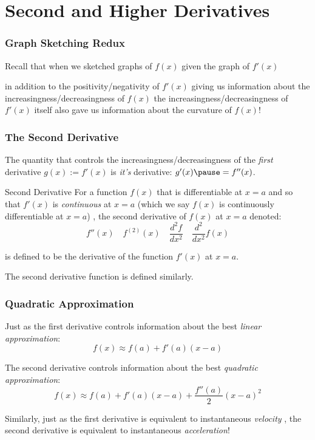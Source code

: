 \documentclass{ltx-talk}
\begin{document}
\section{Second and Higher Derivatives}

\begin{frame}
  \frametitle{Graph Sketching Redux}

  Recall that when we sketched graphs of $f(x)$ given the graph of $f'(x)$ \vfill \pause

  in addition to the positivity/negativity of $f'(x)$ giving us information about the increasingness/decreasingness of $f(x)$ \pause
  the increasingness/decreasingness of $f'(x)$ itself also gave us information \pause about the curvature of $f(x)$! \pause
\end{frame}

\begin{frame}
  \frametitle{The Second Derivative}
  The quantity that controls the increasingness/decreasingness of the \textit{first} derivative $g(x) := f'(x)$ \pause is \textit{it's} derivative: $g'(x) \pause = f''(x)$. \pause

  \begin{block}{Second Derivative}
    For a function $f(x)$ that is differentiable at $x = a$ \pause
    and so that $f'(x)$ is \textit{continuous} at $x = a$ \pause (which we say $f(x)$ is continuously differentiable at $x = a$) \pause,
    the second derivative of $f(x)$ at $x = a$ denoted: \pause
    \begin{equation}
      f''(x) \quad f^{(2)}(x) \quad \dfrac{d^2 f}{dx^2} \quad \dfrac{d^2}{dx^2} f(x)
    \end{equation} \pause

    is defined to be the derivative of the function $f'(x)$ at $x = a$. \pause

    The second derivative function is defined similarly.
  \end{block}
\end{frame}

\begin{frame}
  \frametitle{Quadratic Approximation}
  Just as the first derivative controls information about the best \textit{linear approximation}: \pause
  \begin{equation}
    f(x) \approx f(a) + f'(a)(x - a)
  \end{equation}\pause

  The second derivative controls information about the best \textit{quadratic approximation}: \pause
  \begin{equation}
    f(x) \approx f(a) + f'(a)(x - a) + \dfrac{f''(a)}{2} (x-a)^2
  \end{equation} \pause

  Similarly, just as the first derivative is equivalent to instantaneous \textit{velocity} \pause, the second derivative is equivalent to instantaneous \textit{acceleration}!
\end{frame}
\end{document}
